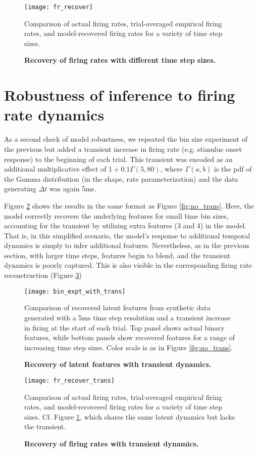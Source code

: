 \documentclass[10pt,letterpaper]{article}
\begin{document}
\begin{figure}[!ht]
    \texttt{[image: fr\_recover]}
	\caption{\bf Recovery of firing rates with different time step sizes.}
    Comparison of actual firing rates, trial-averaged empirical firing rates, and model-recovered firing rates for a variety of time step sizes.
	\label{fig:no_trans_fr}
\end{figure}

\section*{Robustness of inference to firing rate dynamics}
As a second check of model robustness, we repeated the bin size experiment of the previous but added a transient increase in firing rate (e.g. stimulus onset response) to the beginning of each trial. This transient was encoded as an additional multiplicative effect of $1 + 0.1\Gamma(5, 80)$, where $\Gamma(a, b)$ is the pdf of the Gamma distribution (in the shape, rate parameterization) and the data generating $\Delta t$ was again 5ms.

Figure \ref{fig:with_trans} shows the results in the same format as Figure \ref{fig:no_trans}. Here, the model correctly recovers the underlying features for small time bin sizes, accounting for the transient by utilizing extra features (3 and 4) in the model. That is, in this simplified scenario, the model's response to additional temporal dynamics is simply to infer additional features. Nevertheless, as in the previous section, with larger time steps, features begin to blend, and the transient dynamics is poorly captured. This is also visible in the corresponding firing rate reconstruction (Figure \ref{fig:with_trans_fr})

\begin{figure}[!ht]
    \texttt{[image: bin\_expt\_with\_trans]}
	\caption{\bf Recovery of latent features with transient dynamics.}
    Comparison of recovered latent features from synthetic data generated with a 5ms time step resolution and a transient increase in firing at the start of each trial. Top panel shows actual binary features, while bottom panels show recovered features for a range of increasing time step sizes. Color scale is as in Figure \ref{fig:no_trans}.
    \label{fig:with_trans}
\end{figure}

\begin{figure}[!ht]
    \texttt{[image: fr\_recover\_trans]}
	\caption{\bf Recovery of firing rates with transient dynamics.}
    Comparison of actual firing rates, trial-averaged empirical firing rates, and model-recovered firing rates for a variety of time step sizes. Cf. Figure \ref{fig:no_trans_fr}, which shares the same latent dynamics but lacks the transient.
	\label{fig:with_trans_fr}
\end{figure}
\end{document}
